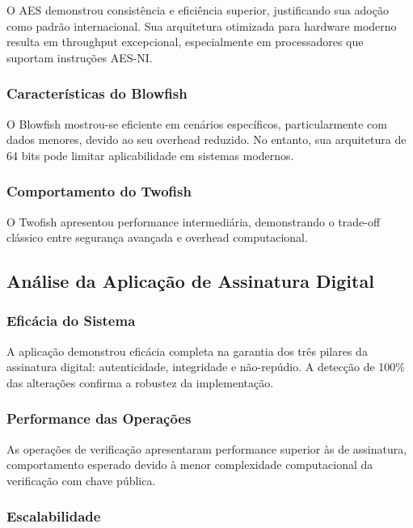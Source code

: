 \documentclass[12pt,a4paper,oneside]{article}
\begin{document}
O AES demonstrou consistência e eficiência superior, justificando sua adoção como padrão internacional. Sua arquitetura otimizada para hardware moderno resulta em throughput excepcional, especialmente em processadores que suportam instruções AES-NI.

\subsubsection{Características do Blowfish}

O Blowfish mostrou-se eficiente em cenários específicos, particularmente com dados menores, devido ao seu overhead reduzido. No entanto, sua arquitetura de 64 bits pode limitar aplicabilidade em sistemas modernos.

\subsubsection{Comportamento do Twofish}

O Twofish apresentou performance intermediária, demonstrando o trade-off clássico entre segurança avançada e overhead computacional.

\subsection{Análise da Aplicação de Assinatura Digital}

\subsubsection{Eficácia do Sistema}

A aplicação demonstrou eficácia completa na garantia dos três pilares da assinatura digital: autenticidade, integridade e não-repúdio. A detecção de 100\% das alterações confirma a robustez da implementação.

\subsubsection{Performance das Operações}

As operações de verificação apresentaram performance superior às de assinatura, comportamento esperado devido à menor complexidade computacional da verificação com chave pública.

\subsubsection{Escalabilidade}
\end{document}
